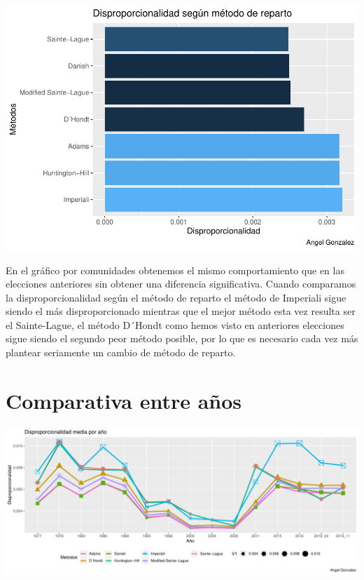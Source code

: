 \documentclass[12pt,a4paper,]{book}
\numberwithin{dummy}{section}
\theoremstyle{ocrenumbox}
\theoremstyle{blacknumex}
\theoremstyle{blacknumbox}
\theoremstyle{ocrenum}
\theoremstyle{ocrenum}
\begin{document}
\begin{center}\includegraphics[width=0.95\linewidth]{figurasR/unnamed-chunk-138-2} \end{center}

En el gráfico por comunidades obtenemos el mismo comportamiento que en
las elecciones anteriores sin obtener una diferencia significativa.
Cuando comparamos la disproporcionalidad según el método de reparto el
método de Imperiali sigue siendo el más disproporcionado mientras que el
mejor método esta vez resulta ser el Sainte-Lague, el método D´Hondt
como hemos visto en anteriores elecciones sigue siendo el segundo peor
método posible, por lo que es necesario cada vez más plantear seriamente
un cambio de método de reparto.

\hypertarget{comparativa-entre-auxf1os}{%
\section{Comparativa entre años}\label{comparativa-entre-auxf1os}}

\begin{center}\includegraphics[width=0.95\linewidth]{figurasR/unnamed-chunk-139-1} \end{center}
\end{document}
